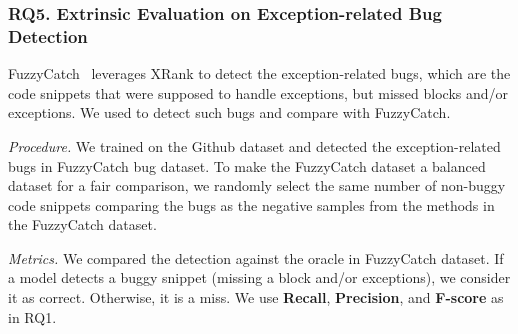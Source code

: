 
\subsubsection{RQ5. Extrinsic Evaluation on Exception-related Bug Detection\\}


 FuzzyCatch~\cite{xrank-fse20} leverages XRank
to detect the exception-related bugs, which are the code snippets that
were supposed to handle exceptions, but missed
 blocks and/or exceptions. We used {\tool} to detect
such bugs and compare with FuzzyCatch.

{\em Procedure.} We trained {\tool} on the Github dataset and detected
the exception-related bugs in FuzzyCatch bug dataset. To make the FuzzyCatch dataset a balanced dataset for a fair comparison, we randomly select the same number of non-buggy code snippets comparing the bugs as the negative samples from the methods in the FuzzyCatch dataset.

{\em Metrics.} We compared the detection against the oracle in
FuzzyCatch dataset. If a model detects a buggy snippet (missing a
 block and/or exceptions), we consider it as correct.
Otherwise, it is a miss. We use {\bf Recall}, {\bf
  Precision}, and {\bf F-score} as in RQ1.
